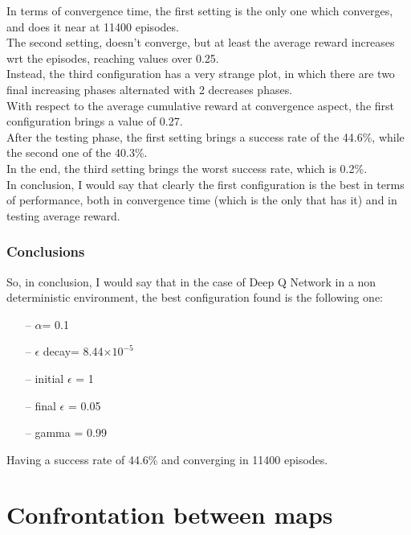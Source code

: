 \documentclass{article}
\begin{document}
\clearpage

In terms of convergence time, the first setting is the only one which converges, and does it near at 11400 episodes.
\\
The second setting, doesn't converge, but at least the average reward increases wrt the episodes, reaching values over 0.25.
\\
Instead, the third configuration has a very strange plot, in which there are two final increasing phases alternated with 2 decreases phases.
\\
With respect to the average cumulative reward at convergence aspect, the first configuration brings a value of 0.27.
\\
After the testing phase, the first setting brings a success rate of the 44.6\%, while the second one of the 40.3\%.
\\
In the end, the third setting brings the worst success rate, which is 0.2\%.
\\
In conclusion, I would say that clearly the first configuration is the best in terms of performance, both in convergence time (which is the only that has it) and in testing average reward.



\subsubsection{Conclusions}

So, in conclusion, I would say that in the case of Deep Q Network in a non deterministic environment, the best configuration found is the following one:

\begin{itemize}
\item[--] $\alpha$= 0.1
\item[--] $\epsilon$ decay= 8.44$\times10^{-5}$
\item[--] initial $\epsilon$ = 1
\item[--] final $\epsilon$ = 0.05
\item[--] gamma = 0.99
\end{itemize}

Having a success rate of 44.6\% and converging in 11400 episodes.


\section{Confrontation between maps}
\end{document}
